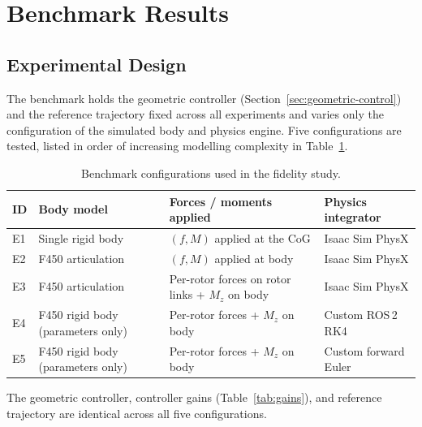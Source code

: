 \documentclass[11pt]{article}
\theoremstyle{remark}
\begin{document}
\section{Benchmark Results}
\label{sec:results}

\subsection{Experimental Design}
\label{sec:experimental-design}

The benchmark holds the geometric controller (Section~\ref{sec:geometric-control}) and the reference trajectory fixed across all experiments and varies only the configuration of the simulated body and physics engine. Five configurations are tested, listed in order of increasing modelling complexity in Table~\ref{tab:experiments}.

\begin{table}[H]
    \centering
    \caption{Benchmark configurations used in the fidelity study.}
    \label{tab:experiments}
    \footnotesize
    \renewcommand{\arraystretch}{1.18}
    \setlength{\tabcolsep}{5pt}
    \begin{tabular}{@{}p{0.7cm} p{3.0cm} p{5.6cm} p{3.0cm}@{}}
        \toprule
        \textbf{ID} & \textbf{Body model} & \textbf{Forces / moments applied} & \textbf{Physics integrator} \\
        \midrule
        E1 & Single rigid body
           & $(f, M)$ applied at the CoG
           & Isaac Sim PhysX \\
        E2 & F450 articulation
           & $(f, M)$ applied at body
           & Isaac Sim PhysX \\
        E3 & F450 articulation
           & Per-rotor forces on rotor links + $M_z$ on body
           & Isaac Sim PhysX \\
        E4 & F450 rigid body \newline (parameters only)
           & Per-rotor forces + $M_z$ on body
           & Custom ROS\,2 RK4 \\
        E5 & F450 rigid body \newline (parameters only)
           & Per-rotor forces + $M_z$ on body
           & Custom forward Euler \\
        \bottomrule
    \end{tabular}
    \vspace{0.3em}
    \parbox{0.95\textwidth}{\footnotesize
    The geometric controller, controller gains (Table~\ref{tab:gains}), and reference trajectory are identical across all five configurations.}
\end{table}
\end{document}
